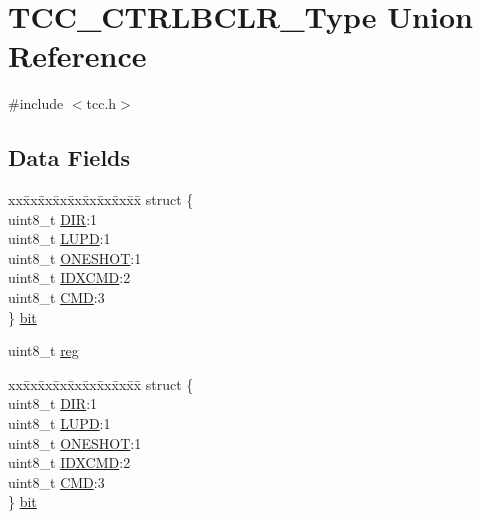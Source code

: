 \hypertarget{union_t_c_c___c_t_r_l_b_c_l_r___type}{}\section{T\+C\+C\+\_\+\+C\+T\+R\+L\+B\+C\+L\+R\+\_\+\+Type Union Reference}
\label{union_t_c_c___c_t_r_l_b_c_l_r___type}


{\ttfamily \#include $<$tcc.\+h$>$}

\subsection*{Data Fields}
\begin{DoxyCompactItemize}
\item 
\begin{tabbing}
xx\=xx\=xx\=xx\=xx\=xx\=xx\=xx\=xx\=\kill
struct \{\\
\>uint8\_t \mbox{\hyperlink{union_t_c_c___c_t_r_l_b_c_l_r___type_a58808c7e66b07b82b662e956b63f7e70}{DIR}}:1\\
\>uint8\_t \mbox{\hyperlink{union_t_c_c___c_t_r_l_b_c_l_r___type_a8ac44d571fac48acf217bb9425d04bdb}{LUPD}}:1\\
\>uint8\_t \mbox{\hyperlink{union_t_c_c___c_t_r_l_b_c_l_r___type_a7b9c94dc8f69244e81941bd1c96ca561}{ONESHOT}}:1\\
\>uint8\_t \mbox{\hyperlink{union_t_c_c___c_t_r_l_b_c_l_r___type_abcff3047a0fc0306fbcbb7fac8c26b97}{IDXCMD}}:2\\
\>uint8\_t \mbox{\hyperlink{union_t_c_c___c_t_r_l_b_c_l_r___type_a1c855495e78c2efdf239795ed16d8b3e}{CMD}}:3\\
\} \mbox{\hyperlink{union_t_c_c___c_t_r_l_b_c_l_r___type_aa7aed71aaf3c72e82c65c46636b80ad5}{bit}}\\

\end{tabbing}\item 
uint8\+\_\+t \mbox{\hyperlink{union_t_c_c___c_t_r_l_b_c_l_r___type_a9428adc9af4653a2050e2536b55dec8d}{reg}}
\item 
\begin{tabbing}
xx\=xx\=xx\=xx\=xx\=xx\=xx\=xx\=xx\=\kill
struct \{\\
\>uint8\_t \mbox{\hyperlink{union_t_c_c___c_t_r_l_b_c_l_r___type_a58808c7e66b07b82b662e956b63f7e70}{DIR}}:1\\
\>uint8\_t \mbox{\hyperlink{union_t_c_c___c_t_r_l_b_c_l_r___type_a8ac44d571fac48acf217bb9425d04bdb}{LUPD}}:1\\
\>uint8\_t \mbox{\hyperlink{union_t_c_c___c_t_r_l_b_c_l_r___type_a7b9c94dc8f69244e81941bd1c96ca561}{ONESHOT}}:1\\
\>uint8\_t \mbox{\hyperlink{union_t_c_c___c_t_r_l_b_c_l_r___type_abcff3047a0fc0306fbcbb7fac8c26b97}{IDXCMD}}:2\\
\>uint8\_t \mbox{\hyperlink{union_t_c_c___c_t_r_l_b_c_l_r___type_a1c855495e78c2efdf239795ed16d8b3e}{CMD}}:3\\
\} \mbox{\hyperlink{union_t_c_c___c_t_r_l_b_c_l_r___type_ac48b2c0f34937f93c585d8bd50fdf498}{bit}}\\

\end{tabbing}\end{DoxyCompactItemize}


